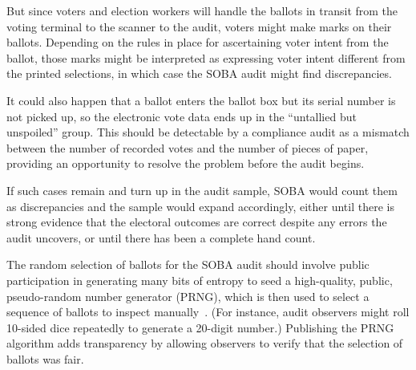 But since voters and election workers will handle the ballots in transit from the voting terminal 
to the scanner to the audit, voters might make marks on their ballots.
Depending on the rules in place for ascertaining voter intent from the ballot,
those marks might be interpreted as expressing voter intent different from the
printed selections, in which case the SOBA audit might find discrepancies.

It could also happen that a ballot enters the ballot box but its serial number is not
picked up, so the electronic vote data ends up in the ``untallied but unspoiled'' group.
This should be detectable by a compliance audit \cite{benalohEtal11,lindemanStark12,starkWagner12} 
as a mismatch between the number of recorded votes and the number of pieces of paper,
providing an opportunity to resolve the problem before the audit begins.

If such cases remain and turn up in the audit sample, SOBA would count them as discrepancies 
and the sample would expand accordingly, either
until there is strong evidence that the electoral outcomes are correct despite any errors the audit
uncovers, or until there has been a complete hand count.

The random selection of ballots for the SOBA audit should involve public participation in
generating many bits of entropy to seed a high-quality, public, pseudo-random 
number generator (PRNG), which is then used to select a sequence of
ballots to inspect manually~\cite{lindemanStark12}.
(For instance, audit observers might roll 10-sided dice repeatedly to generate a 20-digit number.)
Publishing the PRNG algorithm adds transparency by allowing observers to verify
that the selection of ballots was fair.



